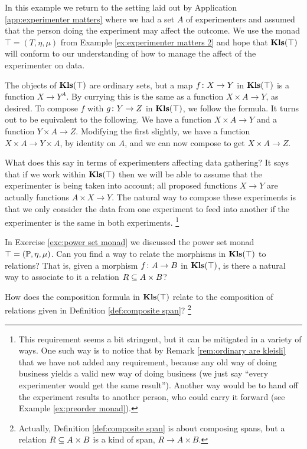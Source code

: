 \begin{example}\label{ex:experimenter matters 3}

In this example we return to the setting laid out by Application \ref{app:experimenter matters} where we had a set $A$ of experimenters and assumed that the person doing the experiment may affect the outcome. We use the monad $\top=(T,\eta,\mu)$ from Example \ref{ex:experimenter matters 2} and hope that $\Kls(\top)$ will conform to our understanding of how to manage the affect of the experimenter on data.

The objects of $\Kls(\top)$ are ordinary sets, but a map $f\taking X\to Y$ in $\Kls(\top)$ is a function $X\to Y^A$. By currying this is the same as a function $X\times A\to Y$, as desired. To compose $f$ with $g\taking Y\to Z$ in $\Kls(\top)$, we follow the formula. It turns out to be equivalent to the following. We have a function $X\times A\to Y$ and a function $Y\times A\to Z$. Modifying the first slightly, we have a function $X\times A\to Y\times A$, by identity on $A$, and we can now compose to get $X\times A\to Z$.

What does this say in terms of experimenters affecting data gathering? It says that if we work within $\Kls(\top)$ then we will be able to assume that the experimenter is being taken into account; all proposed functions $X\to Y$ are actually functions $A\times X\to Y$. The natural way to compose these experiments is that we only consider the data from one experiment to feed into another if the experimenter is the same in both experiments.
\footnote{This requirement seems a bit stringent, but it can be mitigated in a variety of ways. One such way is to notice that by Remark \ref{rem:ordinary are kleisli} that we have not added any requirement, because any old way of doing business yields a valid new way of doing business (we just say “every experimenter would get the same result”). Another way would be to hand off the experiment results to another person, who could carry it forward (see Example \ref{ex:preorder monad}).}

\end{example}

\begin{exercise}\label{exc:kleisli powerset relations}
In Exercise \ref{exc:power set monad} we discussed the power set monad $\top=(\PP,\eta,\mu)$.
\sexc Can you find a way to relate the morphisms in $\Kls(\top)$ to relations? That is, given a morphism $f\taking A\to B$ in $\Kls(\top)$, is there a natural way to associate to it a relation $R\ss A\times B$?
\item How does the composition formula in $\Kls(\top)$ relate to the composition of relations given in Definition \ref{def:composite span}?
\footnote{Actually, Definition \ref{def:composite span} is about composing spans, but a relation $R\ss A\times B$ is a kind of span, $R\to A\times B$.}
\endsexc
\end{exercise}

